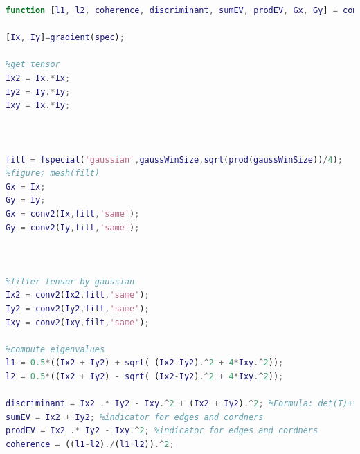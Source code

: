\documentclass[12pt]{article}
\numberwithin{figure}{section}
\numberwithin{table}{section}
\begin{document}
\begin{lstlisting}[language=Matlab]
function [l1, l2, coherence, discriminant, sumEV, prodEV, Gx, Gy] = computeTensor(spec,gaussWinSize)

[Ix, Iy]=gradient(spec);

%get tensor
Ix2 = Ix.*Ix;
Iy2 = Iy.*Iy;
Ixy = Ix.*Iy;



filt = fspecial('gaussian',gaussWinSize,sqrt(prod(gaussWinSize))/4); 
%figure; mesh(filt)
Gx = Ix;
Gy = Iy;
Gx = conv2(Ix,filt,'same');
Gy = conv2(Iy,filt,'same');



%filter tensor by gaussian
Ix2 = conv2(Ix2,filt,'same');
Iy2 = conv2(Iy2,filt,'same');
Ixy = conv2(Ixy,filt,'same');

%compute eigenvalues
l1 = 0.5*((Ix2 + Iy2) + sqrt( (Ix2-Iy2).^2 + 4*Ixy.^2)); 
l2 = 0.5*((Ix2 + Iy2) - sqrt( (Ix2-Iy2).^2 + 4*Ixy.^2)); 

discriminant = Ix2 .* Iy2 - Ixy.^2 + (Ix2 + Iy2).^2; %Formula: det(T)+trace(T)^2
sumEV = Ix2 + Iy2; %indicator for edges and cordners
prodEV = Ix2 .* Iy2 - Ixy.^2; %indicator for edges and cordners
coherence = ((l1-l2)./(l1+l2)).^2;


\end{lstlisting}
\newpage
\end{document}
